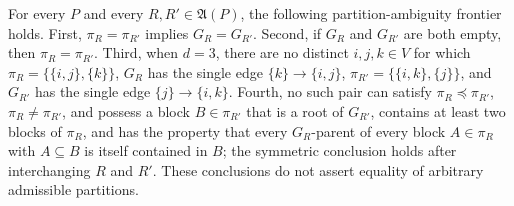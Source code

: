 For every \(P\) and every \(R,R'\in\mathfrak A(P)\), the following partition-ambiguity frontier holds. First, \(\pi_R=\pi_{R'}\) implies \(G_R=G_{R'}\). Second, if \(G_R\) and \(G_{R'}\) are both empty, then \(\pi_R=\pi_{R'}\). Third, when \(d=3\), there are no distinct \(i,j,k\in V\) for which \(\pi_R=\{\{i,j\},\{k\}\}\), \(G_R\) has the single edge \(\{k\}\to\{i,j\}\), \(\pi_{R'}=\{\{i,k\},\{j\}\}\), and \(G_{R'}\) has the single edge \(\{j\}\to\{i,k\}\). Fourth, no such pair can satisfy \(\pi_R\preceq\pi_{R'}\), \(\pi_R\neq\pi_{R'}\), and possess a block \(B\in\pi_{R'}\) that is a root of \(G_{R'}\), contains at least two blocks of \(\pi_R\), and has the property that every \(G_R\)-parent of every block \(A\in\pi_R\) with \(A\subseteq B\) is itself contained in \(B\); the symmetric conclusion holds after interchanging \(R\) and \(R'\). These conclusions do not assert equality of arbitrary admissible partitions.